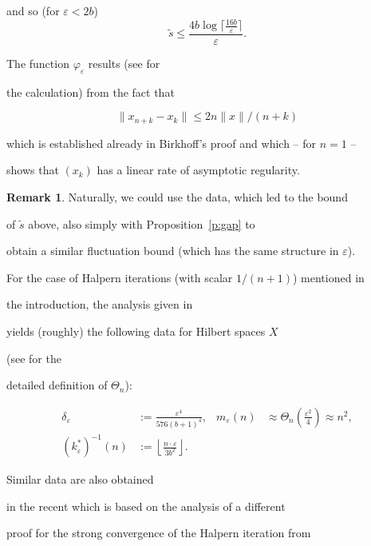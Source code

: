 \documentclass[1p]{elsarticle}
\theoremstyle{plain}
\theoremstyle{definition}
\newtheorem{rmk}[thm]{Remark}
\theoremstyle{remark}
\renewcommand{\epsilon}{\varepsilon}
\theoremstyle{definition}
\begin{document}
{and so (for $\varepsilon <2b$) \[ \tilde s \leq \frac{ 4 b\log \big\lceil 

\frac{16b}{\epsilon}\big\rceil }{\epsilon}.\]

The function $\varphi_{\varepsilon}$ results (see \cite{Avigad/Rute} for 

the calculation) from the fact that 

\[ \| x_ {n+k}-x_k\|\le 2n\| x\|/(n+k) \]

which is established already in Birkhoff's proof and which -- for $n=1$ -- 

shows that $(x_k)$ has a linear rate of asymptotic regularity.

\begin{rmk}

Naturally, we could use the data, which led to the bound 

of $\tilde s$ above, also simply with Proposition~\ref{p:gap} to

obtain a similar fluctuation bound (which has the same structure in $\epsilon$).

\end{rmk}



For the case of Halpern iterations (with scalar $1/(n+1)$) mentioned in 

the introduction, the analysis given in \cite{Kohlenbach/Leustean6}   

yields (roughly) the following data for Hilbert spaces $X$ 

(see \cite{Kohlenbach/Leustean6,Addendum} for the 

detailed definition of $\Theta_n$):

\begin{align*}

\delta_\epsilon &:= \frac{\epsilon^4}{576(b+1)^4},& m_\epsilon(n)&\approx \Theta_n(\frac{\epsilon^2}{4})\approx n^2,\\

(k^*_\epsilon)^{-1}(n)&:=\left\lfloor\frac{n\cdot\epsilon}{3b^2}

\right\rfloor.& 

\end{align*}

Similar data are also obtained  

in the recent \cite{Koernlein} which is based on the analysis of a different 

proof for the strong convergence of the Halpern iteration from 

}
\end{document}
